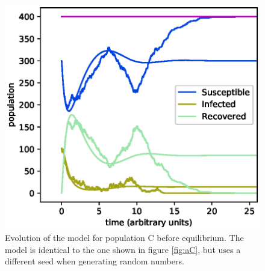\documentclass[a4paper,10pt,twocolumn]{article}
\begin{document}
\begin{figure}
	\centering
	\includegraphics[width=\linewidth]{a4b3c05_n1742748670.eps}
	\caption{Evolution of the model for population C before equilibrium. The model is identical to the one shown in figure \ref{fig:aC}, but uses a different seed when generating random numbers.}
	\label{fig:C}
\end{figure}
\end{document}
